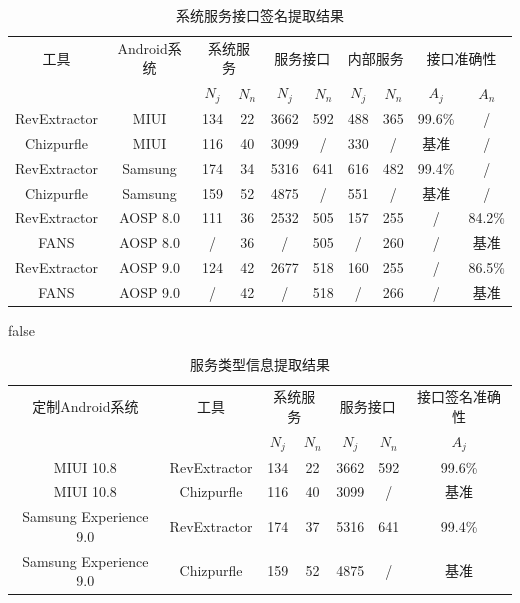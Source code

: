 \documentclass[winfonts,master,twoside]{njuthesis}
\begin{document}
\begin{table}[!htbp]
	\centering
	\begin{tabular}{ccc|cc|cc|cc|c}
		\toprule{}
		工具 & Android系统 & \multicolumn{2}{c}{系统服务} & \multicolumn{2}{c}{服务接口} & \multicolumn{2}{c}{内部服务} & \multicolumn{2}{c}{接口准确性} \\
		& & $N_j$ & $N_n$ & $N_j$ & $N_n$ & $N_j$ & $N_n$ & $A_j$ & $A_n$\\
		\midrule
		RevExtractor & MIUI               & 134& 22 &3662&592 &488 &365&99.6\%&/     \\
		Chizpurfle   & MIUI               & 116& 40 &3099& /  &330 & / &基准   &/     \\
		RevExtractor & Samsung            & 174& 34 &5316&641 &616 &482&99.4\%&/     \\
		Chizpurfle   & Samsung            & 159& 52 &4875& /  &551 & / &基准   &/     \\
		RevExtractor & AOSP 8.0           & 111& 36 &2532&505 &157 &255& /    &84.2\%\\
		FANS         & AOSP 8.0           & /  & 36 & /  &505 & /  &260& /    &基准   \\
        RevExtractor & AOSP 9.0           & 124& 42 &2677&518 &160 &255& /    &86.5\%\\
        FANS         & AOSP 9.0           & /  & 42 & /  &518 & /  &266& /    &基准   \\
		\bottomrule
	\end{tabular}
	\caption{系统服务接口签名提取结果}
	\label{tbl:extractor_comp}
\end{table}

\if false
\begin{table}[!htbp]
	\centering
	\begin{tabular}{ccc|cc|cc}
		\toprule{}
		定制Android系统 & 工具 & \multicolumn{2}{c}{系统服务} & \multicolumn{2}{c}{服务接口} & 接口签名准确性 \\
		& & $N_j$ & $N_n$ & $N_j$ & $N_n$ & $A_j$ \\
		\midrule
		MIUI 10.8              & RevExtractor & 134& 22 &3662&592 &99.6\%     \\
		MIUI 10.8              & Chizpurfle   & 116& 40 &3099& /  &基准        \\
		Samsung Experience 9.0 & RevExtractor & 174& 37 &5316&641 &99.4\%     \\
		Samsung Experience 9.0 & Chizpurfle   & 159& 52 &4875& /  &基准        \\
		\bottomrule
	\end{tabular}
	\caption{服务类型信息提取结果}
	\label{tbl:extractor_comp}
\end{table}
\end{document}
